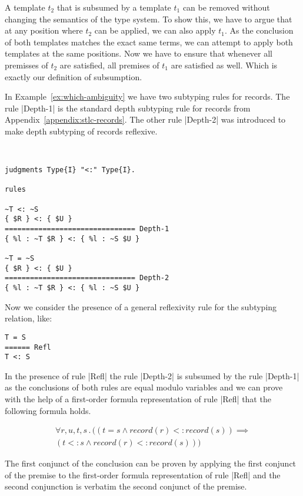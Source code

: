 A template $t_2$ that is subsumed by a template $t_1$ can be removed
without changing the semantics of the type system. To show this, we
have to argue that at any position where $t_2$ can be applied, we can
also apply $t_1$. As the conclusion of both templates matches the
exact same terms, we can attempt to apply both templates at the same
positions. Now we have to ensure that whenever all premisses of $t_2$
are satisfied, all premises of $t_1$ are satisfied as well. Which is
exactly our definition of subsumption.

In Example~\ref{ex:which-ambiguity} we have two subtyping rules for
records. The rule \code|Depth-1| is the standard depth subtyping rule
for records from Appendix~\ref{appendix:stlc-records}. The other rule
\code|Depth-2| was introduced to make depth subtyping of records
reflexive.

\begin{example}{~}
\begin{lstlisting}[language=sltc]
judgments Type{I} "<:" Type{I}.

rules

~T <: ~S
{ $R } <: { $U }
=============================== Depth-1
{ %l : ~T $R } <: { %l : ~S $U }

~T = ~S
{ $R } <: { $U }
=============================== Depth-2
{ %l : ~T $R } <: { %l : ~S $U }
\end{lstlisting}
\label{ex:which-ambiguity}
\end{example}

Now we consider the presence of a general reflexivity rule for the
subtyping relation, like:

\begin{lstlisting}
T = S
====== Refl
T <: S
\end{lstlisting}

In the presence of rule \code|Refl| the rule \code|Depth-2| is
subsumed by the rule \code|Depth-1| as the conclusions of both rules
are equal modulo variables and we can prove with the help of a
first-order formula representation of rule \code|Refl| that the
following formula holds.

\begin{multline}
  \forall r,u,t,s \,.\, ((t = s \land record(r) <: record(s)) \implies
  \\ (t <: s \land record(r) <: record(s)))
\end{multline}

The first conjunct of the conclusion can be proven by applying the
first conjunct of the premise to the first-order formula
representation of rule \code|Refl| and the second conjunction is
verbatim the second conjunct of the premise.

